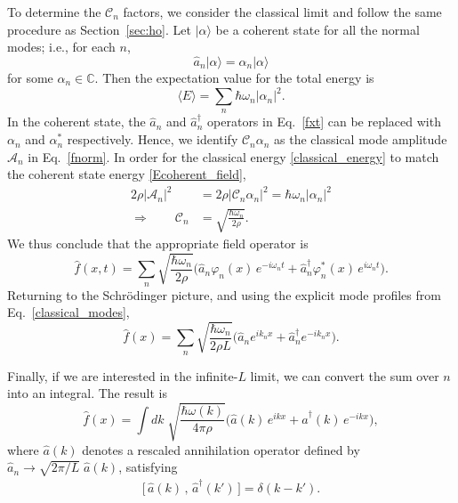 \documentclass[prx,12pt]{revtex4-2}
\begin{document}
To determine the $\mathcal{C}_n$ factors, we consider the classical
limit and follow the same procedure as Section~\ref{sec:ho}.  Let
$|\alpha\rangle$ be a coherent state for all the normal modes; i.e.,
for each $n$,
\begin{equation}
  \hat{a}_n |\alpha\rangle = \alpha_n |\alpha\rangle
\end{equation}
for some $\alpha_n \in \mathbb{C}$.  Then the expectation value for
the total energy is
\begin{equation}
  \langle E\rangle = \sum_n \hbar \omega_n |\alpha_n|^2.
  \label{Ecoherent_field}
\end{equation}
In the coherent state, the $\hat{a}_n$ and $\hat{a}_n^\dagger$
operators in Eq.~\eqref{fxt} can be replaced with $\alpha_n$ and
$\alpha_n^*$ respectively.  Hence, we identify $\mathcal{C}_n
\alpha_n$ as the classical mode amplitude $\mathcal{A}_n$ in
Eq.~\eqref{fnorm}.  In order for the classical energy
\eqref{classical_energy} to match the coherent state energy
\eqref{Ecoherent_field},
\begin{align}
  2\rho |\mathcal{A}_n|^2 &= 2 \rho |\mathcal{C}_n\alpha_n|^2
  = \hbar \omega_n |\alpha_n|^2 \\ \Rightarrow \qquad
  \mathcal{C}_n &= \sqrt{\frac{\hbar\omega_n}{2\rho}}.
\end{align}
We thus conclude that the appropriate field operator is
\begin{equation}
  \hat{f}(x,t) = \sum_n \sqrt{\frac{\hbar\omega_n}{2\rho}}
  \Big(\hat{a}_n \varphi_n(x) \,e^{-i\omega_nt}
  + \hat{a}_n^\dagger \varphi_n^*(x) \, e^{i\omega_nt} \Big).
\end{equation}
Returning to the Schr\"odinger picture, and using the explicit mode
profiles from Eq.~\eqref{classical_modes},
\begin{equation}
  \hat{f}(x) = \sum_n \sqrt{\frac{\hbar\omega_n}{2\rho L}}
  \Big(\hat{a}_n e^{ik_n x}
  + \hat{a}_n^\dagger e^{-ik_n x} \Big).
\end{equation}

Finally, if we are interested in the infinite-$L$ limit, we can
convert the sum over $n$ into an integral.
The result is
\begin{equation}
  \hat{f}(x) = \int dk\; \sqrt{\frac{\hbar\omega(k)}{4\pi\rho}}
  \Big(\hat{a}(k)\, e^{ik x} + \hat{a}^\dagger(k)\, e^{-ik x} \Big),
\end{equation}
where $\hat{a}(k)$ denotes a rescaled annihilation operator defined by
$\hat{a}_n \rightarrow \sqrt{2\pi/L}\; \hat{a}(k)$, satisfying
\begin{align}
  \big[\,\hat{a}(k)\,,\, \hat{a}^\dagger(k')\,\big] = \delta(k-k').
\end{align}
\end{document}
